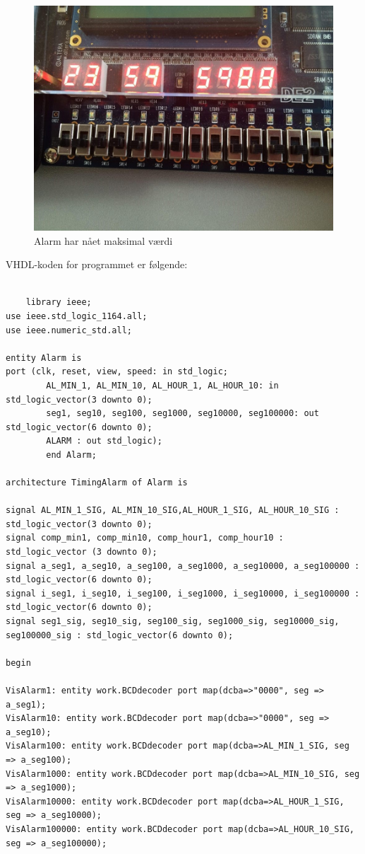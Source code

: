 \begin{enumerate}
		\begin{figure}[h]
			\centering
			\includegraphics[scale=0.45]{pictures/Oevelse6/opg3/AlarmMaxValue.JPG}
			\caption{Alarm har nået maksimal værdi}
			\label{fig:alarmMaxValue}
		\end{figure}


	VHDL-koden for programmet er følgende:
	
	\begin{lstlisting}[caption={Koden for øverste lag af Alarm Watch},label={lst:alarmWatch}]
		
	library ieee;
use ieee.std_logic_1164.all;
use ieee.numeric_std.all;

entity Alarm is
port (clk, reset, view, speed: in std_logic;
		AL_MIN_1, AL_MIN_10, AL_HOUR_1, AL_HOUR_10: in std_logic_vector(3 downto 0);
		seg1, seg10, seg100, seg1000, seg10000, seg100000: out std_logic_vector(6 downto 0);
		ALARM : out std_logic);
		end Alarm;
		
architecture TimingAlarm of Alarm is

signal AL_MIN_1_SIG, AL_MIN_10_SIG,AL_HOUR_1_SIG, AL_HOUR_10_SIG : std_logic_vector(3 downto 0);
signal comp_min1, comp_min10, comp_hour1, comp_hour10 : std_logic_vector (3 downto 0);
signal a_seg1, a_seg10, a_seg100, a_seg1000, a_seg10000, a_seg100000 : std_logic_vector(6 downto 0);
signal i_seg1, i_seg10, i_seg100, i_seg1000, i_seg10000, i_seg100000 : std_logic_vector(6 downto 0);
signal seg1_sig, seg10_sig, seg100_sig, seg1000_sig, seg10000_sig, seg100000_sig : std_logic_vector(6 downto 0);

begin

VisAlarm1: entity work.BCDdecoder port map(dcba=>"0000", seg => a_seg1);
VisAlarm10: entity work.BCDdecoder port map(dcba=>"0000", seg => a_seg10);
VisAlarm100: entity work.BCDdecoder port map(dcba=>AL_MIN_1_SIG, seg => a_seg100);
VisAlarm1000: entity work.BCDdecoder port map(dcba=>AL_MIN_10_SIG, seg => a_seg1000);
VisAlarm10000: entity work.BCDdecoder port map(dcba=>AL_HOUR_1_SIG, seg => a_seg10000);
VisAlarm100000: entity work.BCDdecoder port map(dcba=>AL_HOUR_10_SIG, seg => a_seg100000);


\end{lstlisting}
\end{enumerate}
